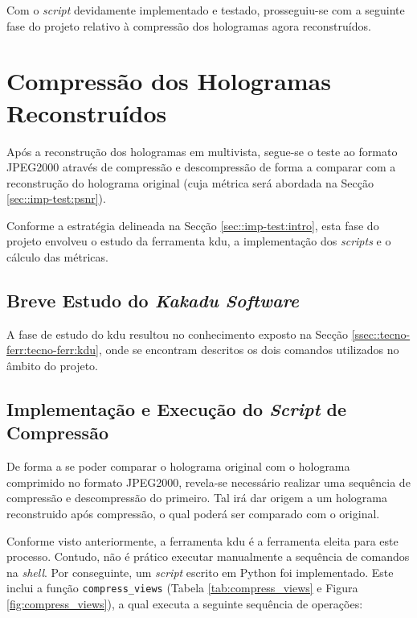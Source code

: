Com o \textit{script} devidamente implementado e testado, prosseguiu-se com a seguinte fase do projeto relativo à compressão dos hologramas agora reconstruídos.


\section{Compressão dos Hologramas Reconstruídos}
\label{sec::imp-test:holo-compress}

Após a reconstrução dos hologramas em multivista, segue-se o teste ao formato JPEG2000 através de compressão e descompressão de forma a comparar com a reconstrução do holograma original (cuja métrica será abordada na Secção \ref{sec::imp-test:psnr}).

Conforme a estratégia delineada na Secção \ref{sec::imp-test:intro}, esta fase do projeto envolveu o estudo da ferramenta \ac{kdu}, a implementação dos \textit{scripts} e o cálculo das métricas.

\subsection{Breve Estudo do \textit{Kakadu Software}}
\label{ssec::imp-test:holo-compress:estudo-kdu}

A fase de estudo do \ac{kdu} resultou no conhecimento exposto na Secção \ref{ssec::tecno-ferr:tecno-ferr:kdu}, onde se encontram descritos os dois comandos utilizados no âmbito do projeto.


\subsection{Implementação e Execução do \textit{Script} de Compressão}
\label{ssec::imp-tes:holo-compress:script}

De forma a se poder comparar o holograma original com o holograma comprimido no formato JPEG2000, revela-se necessário realizar uma sequência de compressão e descompressão do primeiro. Tal irá dar origem a um holograma reconstruido após compressão, o qual poderá ser comparado com o original.

Conforme visto anteriormente, a ferramenta \ac{kdu} é a ferramenta eleita para este processo. Contudo, não é prático executar manualmente a sequência de comandos na \textit{shell}. Por conseguinte, um \textit{script} escrito em Python foi implementado. Este inclui a função \verb|compress_views| (Tabela \ref{tab:compress_views} e Figura \ref{fig:compress_views}), a qual executa a seguinte sequência de operações:


